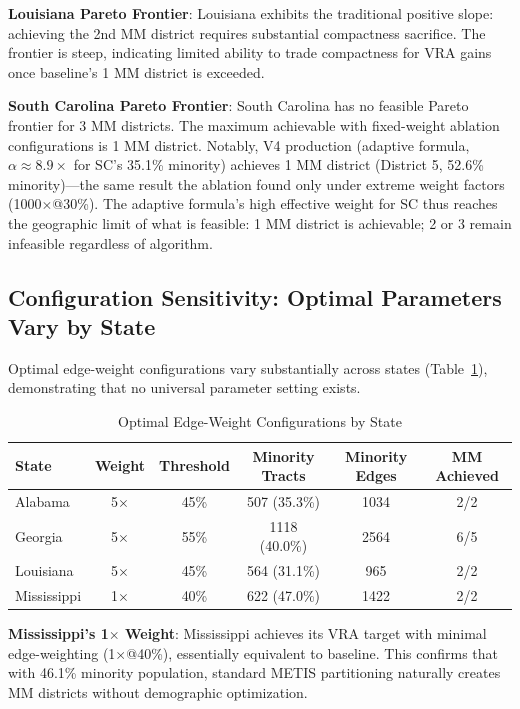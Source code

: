 \textbf{Louisiana Pareto Frontier}: Louisiana exhibits the traditional positive slope: achieving the 2nd MM district requires substantial compactness sacrifice. The frontier is steep, indicating limited ability to trade compactness for VRA gains once baseline's 1 MM district is exceeded.

\textbf{South Carolina Pareto Frontier}: South Carolina has no feasible Pareto frontier for 3 MM districts. The maximum achievable with fixed-weight ablation configurations is 1 MM district. Notably, V4 production (adaptive formula, $\alpha \approx 8.9\times$ for SC's 35.1\% minority) achieves 1 MM district (District 5, 52.6\% minority)---the same result the ablation found only under extreme weight factors (1000$\times$@30\%). The adaptive formula's high effective weight for SC thus reaches the geographic limit of what is feasible: 1 MM district is achievable; 2 or 3 remain infeasible regardless of algorithm.

\subsection{Configuration Sensitivity: Optimal Parameters Vary by State}

Optimal edge-weight configurations vary substantially across states (Table~\ref{tab:optimal-configs}), demonstrating that no universal parameter setting exists.

\begin{table}[htbp]
\centering
\caption{Optimal Edge-Weight Configurations by State}
\label{tab:optimal-configs}
\begin{tabular}{lccccc}
\toprule
\textbf{State} & \textbf{Weight} & \textbf{Threshold} & \textbf{Minority Tracts} & \textbf{Minority Edges} & \textbf{MM Achieved} \\
\midrule
Alabama        & 5$\times$ & 45\% & 507 (35.3\%) & 1034 & 2/2 \\
Georgia        & 5$\times$ & 55\% & 1118 (40.0\%) & 2564 & 6/5 \\
Louisiana      & 5$\times$ & 45\% & 564 (31.1\%) & 965 & 2/2 \\
Mississippi    & 1$\times$ & 40\% & 622 (47.0\%) & 1422 & 2/2 \\
\bottomrule
\end{tabular}
\end{table}

\textbf{Mississippi's 1$\times$ Weight}: Mississippi achieves its VRA target with minimal edge-weighting (1$\times$@40\%), essentially equivalent to baseline. This confirms that with 46.1\% minority population, standard METIS partitioning naturally creates MM districts without demographic optimization.

